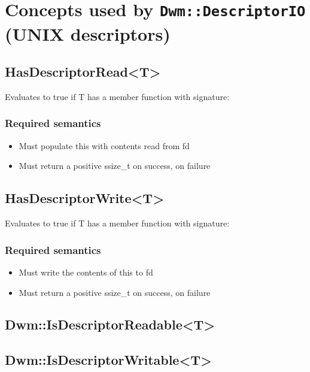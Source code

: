 \begin{minipage}{\textwidth}
\section{Concepts used by \texttt{Dwm::DescriptorIO} (UNIX descriptors)}
\hypertarget{concept:HasDescriptorRead}{\subsection{\ttfamily HasDescriptorRead<T>}}
Evaluates to true if {\ttfamily T} has a member function with signature:


\subsubsection{Required semantics}
\begin{itemize}[noitemsep,nolistsep]
  \item Must populate {\ttfamily *this} with contents read from {\ttfamily fd}
  \item Must return a positive {\ttfamily ssize\_t} on success, {}
    on failure
\end{itemize}

\hypertarget{concept:HasDescriptorWrite}{\subsection{\ttfamily HasDescriptorWrite<T>}}
Evaluates to true if {\ttfamily T} has a member function with signature:


\subsubsection{Required semantics}
\begin{itemize}[noitemsep,nolistsep]
\item Must write the contents of {\ttfamily *this} to {\ttfamily fd}
\item Must return a positive {\ttfamily ssize\_t} on success, {}
  on failure
\end{itemize}

\subsection{\ttfamily Dwm::IsDescriptorReadable<T>}\label{concept:DwmIsDescriptorReadable}

\subsection{\ttfamily Dwm::IsDescriptorWritable<T>}\label{concept:DwmIsDescriptorWritable}
\end{minipage}

